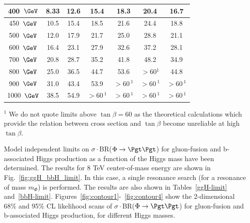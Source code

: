 \begin{table}[!h]
\begin{center}
\begin{tabular}{|c|c|c|c|c|c|c|}
\hline
               400~$\GeV$ &            8.33 &           12.6 &           15.4 &           18.3 &           20.4 &           16.7  \\
\hline
               450~$\GeV$ &           10.5 &           15.4 &           18.5 &           21.6 &           24.4 &           18.8  \\
\hline
               500~$\GeV$ &           12.0 &           17.9 &           21.7 &           25.0 &           28.8 &           21.1  \\
\hline
               600~$\GeV$ &           16.4 &           23.1 &           27.9 &           32.6 &           37.2 &           28.1  \\
\hline
               700~$\GeV$ &           20.8 &           28.7 &           35.2 &           41.8 &           48.2 &           34.9  \\
\hline
               800~$\GeV$ &           25.0 &           36.5 &           44.7 &           53.6 &           $> 60$$^{1}$ &           44.8  \\
\hline
               900~$\GeV$ &           31.0 &           43.4 &           53.9 &           $> 60$\,$^{1}$ &          $> 60$\,$^{1}$ &           $> 60$\,$^{1}$  \\
\hline
              1000~$\GeV$ &           38.5 &           54.9 &          $> 60$\,$^{1}$ &           $> 60$\,$^{1}$ &          $> 60$\,$^{1}$ &           $> 60$\,$^{1}$  \\
\hline
 \end{tabular}
    \label{tab-limits}
  \end{center}
$^{1}$ We do not quote limits above $\tan\beta = 60$ as the theoretical calculations
which provide the relation between cross section and $\tan\beta$ 
become unreliable at high $\tan\beta$. 
\end{table}

\clearpage

Model independent limits on $\sigma\cdot$BR($\Phi\to\Pgt\Pgt$) for gluon-fusion and b-associated Higgs production as a function of the Higgs mass
have been determined.
The results for 8 TeV center-of-mass energy are shown in Fig.~\ref{fig:ggH_bbH_limit}.
In this case, a single resonance search (for a resonance of mass $m_{\Phi}$) is performed.  The results are also shown in Tables~\ref{ggH-limit} and~\ref{bbH-limit}.
Figures~\ref{fig:contour1}-~\ref{fig:contour4} show the 2-dimensional 68\% and 95\% CL likelihood scans of $\sigma\cdot$BR($\Phi\to\Pgt\Pgt$) for gluon-fusion and b-associated Higgs production, for different Higgs masses.



